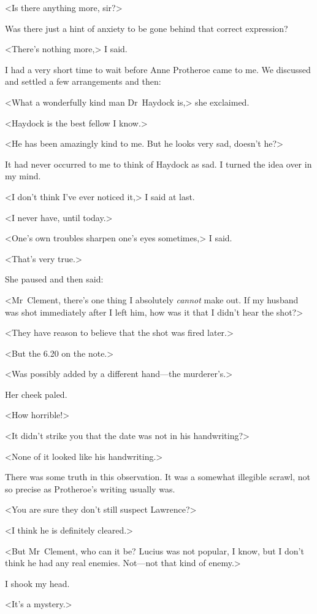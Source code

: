 <Is there anything more, sir?>

Was there just a hint of anxiety to be gone behind that correct expression?

<There's nothing more,> I said.

I had a very short time to wait before Anne Protheroe came to me. We discussed and settled a few arrangements and then:

<What a wonderfully kind man Dr~Haydock is,> she exclaimed.

<Haydock is the best fellow I know.>

<He has been amazingly kind to me. But he looks very sad, doesn't he?>

It had never occurred to me to think of Haydock as sad. I turned the idea over in my mind.

<I don't think I've ever noticed it,> I said at last.

<I never have, until today.>

<One's own troubles sharpen one's eyes sometimes,> I said.

<That's very true.>

She paused and then said:

<Mr~Clement, there's one thing I absolutely \emph{cannot} make out. If my husband was shot immediately after I left him, how was it that I didn't hear the shot?>

<They have reason to believe that the shot was fired later.>

<But the 6.20 on the note.>

<Was possibly added by a different hand—the murderer's.>

Her cheek paled.

<How horrible!>

<It didn't strike you that the date was not in his handwriting?>

<None of it looked like his handwriting.>

There was some truth in this observation. It was a somewhat illegible scrawl, not so precise as Protheroe's writing usually was.

<You are sure they don't still suspect Lawrence?>

<I think he is definitely cleared.>

<But Mr~Clement, who can it be? Lucius was not popular, I know, but I don't think he had any real enemies. Not—not that kind of enemy.>

I shook my head.

<It's a mystery.>

